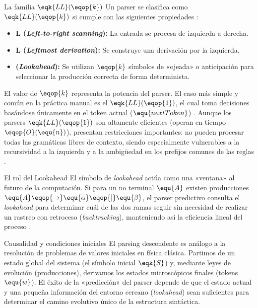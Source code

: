 \begin{definicion}{La familia $\eqk{LL}(\eqop{k})$}
Un parser se clasifica como $\eqk{LL}(\eqop{k})$ si cumple con las siguientes propiedades \cite{aho2006compilers}:
\begin{itemize}
    \item \textbf{L (\textit{Left-to-right scanning}):} La entrada se procesa de izquierda a derecha.
    \item \textbf{L (\textit{Leftmost derivation}):} Se construye una derivación por la izquierda.
    \item \textbf{ (\textit{Lookahead}):} Se utilizan $\eqop{k}$ símbolos de «ojeada» o anticipación para seleccionar la producción correcta de forma determinista.
\end{itemize}
\end{definicion}

El valor de $\eqop{k}$ representa la potencia del parser. El caso más simple y común en la práctica manual es el $\eqk{LL}(\eqop{1})$, el cual toma decisiones basándose únicamente en el token actual ($\equ{nextToken}$) \cite{aho2006compilers}. Aunque los parsers $\eqk{LL}(\eqop{1})$ son altamente eficientes (operan en tiempo $\eqop{O}(\equ{n})$), presentan restricciones importantes: no pueden procesar todas las gramáticas libres de contexto, siendo especialmente vulnerables a la recursividad a la izquierda y a la ambigüedad en los prefijos comunes de las reglas \cite{aho2006compilers,sipser2012introduction}.

\begin{observacion}{El rol del Lookahead}
El símbolo de \textit{lookahead} actúa como una «ventana» al futuro de la computación. Si para un no terminal $\equ{A}$ existen producciones $\equ{A} \eqop{\rightarrow} \equ{\alpha} \eqop{\mid} \equ{\beta}$, el parser predictivo consulta el \textit{lookahead} para determinar cuál de las dos ramas seguir sin necesidad de realizar un rastreo con retroceso (\textit{backtracking}), manteniendo así la eficiencia lineal del proceso \cite{aho2006compilers}.
\end{observacion}

\begin{fisicaconexion}{Causalidad y condiciones iniciales}
El parsing descendente es análogo a la resolución de problemas de valores iniciales en física clásica. Partimos de un estado global del sistema (el símbolo inicial $\eqk{S}$) y, mediante leyes de evolución (producciones), derivamos los estados microscópicos finales (tokens $\equ{w}$). El éxito de la «predicción» del parser depende de que el estado actual y una pequeña información del entorno cercano (\textit{lookahead}) sean suficientes para determinar el camino evolutivo único de la estructura sintáctica.
\end{fisicaconexion}

